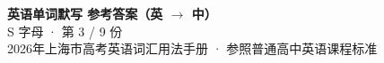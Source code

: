 \documentclass[10pt,a4paper]{article}
\begin{document}
\pagestyle{plain}

\begin{center}
{\LARGE\bfseries 英语单词默写 \quad 参考答案（英 $\to$ 中）}\\[0.22em]
{\large S 字母 · 第 3 / 9 份}\\[0.18em]
{\small 2026年上海市高考英语词汇用法手册 · 参照普通高中英语课程标准}
\end{center}

\vspace{0.2em}
\noindent{\color{rulegray}\rule{\textwidth}{0.8pt}}

\vspace{0.35em}

\vspace{0.25em}
\renewcommand{\arraystretch}{1.32}
\end{document}

